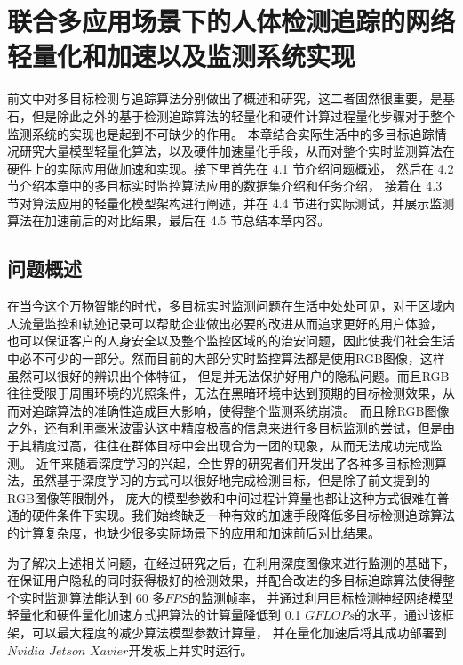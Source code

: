 \chapter{联合多应用场景下的人体检测追踪的网络轻量化和加速以及监测系统实现}
\label{chap4}
前文中对多目标检测与追踪算法分别做出了概述和研究，这二者固然很重要，是基石，但是除此之外的基于检测追踪算法的轻量化和硬件计算过程量化步骤对于整个监测系统的实现也是起到不可缺少的作用。
本章结合实际生活中的多目标追踪情况研究大量模型轻量化算法，以及硬件加速量化手段，从而对整个实时监测算法在硬件上的实际应用做加速和实现。接下里首先在 4.1 节介绍问题概述，
然后在 4.2 节介绍本章中的多目标实时监控算法应用的数据集介绍和任务介绍，
接着在 4.3 节对算法应用的轻量化模型架构进行阐述，并在 4.4 节进行实际测试，并展示监测算法在加速前后的对比结果，最后在 4.5 节总结本章内容。

\section{问题概述}
\label{sec4-1}
在当今这个万物智能的时代，多目标实时监测问题在生活中处处可见，对于区域内人流量监控和轨迹记录可以帮助企业做出必要的改进从而追求更好的用户体验，
也可以保证客户的人身安全以及整个监控区域的的治安问题，因此使我们社会生活中必不可少的一部分。然而目前的大部分实时监控算法都是使用RGB图像，这样虽然可以很好的辨识出个体特征，
但是并无法保护好用户的隐私问题。而且RGB往往受限于周围环境的光照条件，无法在黑暗环境中达到预期的目标检测效果，从而对追踪算法的准确性造成巨大影响，使得整个监测系统崩溃。
而且除RGB图像之外，还有利用毫米波雷达这中精度极高的信息来进行多目标监测的尝试，但是由于其精度过高，往往在群体目标中会出现合为一团的现象，从而无法成功完成监测。
近年来随着深度学习的兴起，全世界的研究者们开发出了各种多目标检测算法，虽然基于深度学习的方式可以很好地完成检测目标，但是除了前文提到的RGB图像等限制外，
庞大的模型参数和中间过程计算量也都让这种方式很难在普通的硬件条件下实现。我们始终缺乏一种有效的加速手段降低多目标检测追踪算法的计算复杂度，也缺少很多实际场景下的应用和加速前后对比结果。

为了解决上述相关问题，在经过研究之后，在利用深度图像来进行监测的基础下，在保证用户隐私的同时获得极好的检测效果，并配合改进的多目标追踪算法使得整个实时监测算法能达到 60 多$FPS$的监测帧率，
并通过利用目标检测神经网络模型轻量化和硬件量化加速方式把算法的计算量降低到 0.1 $GFLOPs$的水平，通过该框架，可以最大程度的减少算法模型参数计算量，
并在量化加速后将其成功部署到$Nvidia$ $Jetson$ $Xavier$开发板上并实时运行。

